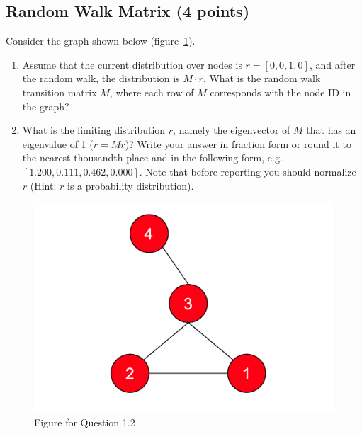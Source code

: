 \documentclass{article}
\numberwithin{figure}{section}
\begin{document}
\subsection{Random Walk Matrix (4 points)}

Consider the graph shown below (figure~\ref{fig:Q4.2}).
\begin{enumerate}
    \item Assume that the current distribution over nodes is $r = [0,0,1,0]$, and after the random walk, the distribution is $M \cdot r$. What is the random walk transition matrix $M$, where each row of $M$ corresponds with the node ID in the graph?
    \item What is the limiting distribution $r$, namely the eigenvector of $M$ that has an eigenvalue of 1 ($r = Mr$)? Write your answer in fraction form or round it to the nearest thousandth place and in the following form, e.g. $[1.200, 0.111, 0.462, 0.000]$. Note that before reporting you should normalize $r$ (Hint: $r$ is a probability distribution).
\end{enumerate}

\begin{figure}[!htb]
\centering
  \includegraphics[width=0.5\columnwidth]{CS224W_Homework1/fig4-2.png}
  \caption{Figure for Question 1.2}
  \label{fig:Q4.2}
\end{figure}
\end{document}
